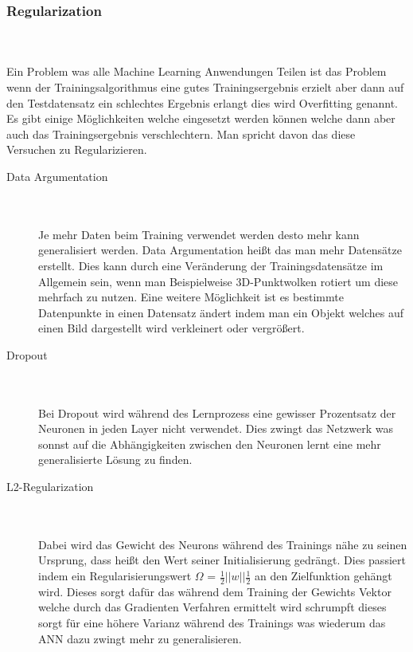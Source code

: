 \documentclass{llncs}
\begin{document}
\subsubsection{Regularization}
~\\\\
Ein Problem was alle Machine Learning Anwendungen Teilen ist das Problem wenn der Trainingsalgorithmus eine gutes Trainingsergebnis erzielt aber dann auf den Testdatensatz ein schlechtes Ergebnis erlangt dies wird Overfitting genannt. Es gibt einige Möglichkeiten welche eingesetzt werden können welche dann aber auch das Trainingsergebnis verschlechtern. Man spricht davon das diese Versuchen zu Regularizieren.

\begin{description}
\item[Data Argumentation]
~\\\\
Je mehr Daten beim Training verwendet werden desto mehr kann generalisiert werden. Data Argumentation heißt das man mehr Datensätze erstellt. Dies kann durch eine Veränderung der Trainingsdatensätze im Allgemein sein, wenn man Beispielweise 3D-Punktwolken rotiert um diese mehrfach zu nutzen. Eine weitere Möglichkeit ist es bestimmte Datenpunkte in einen Datensatz ändert indem man ein Objekt welches auf einen Bild dargestellt wird verkleinert oder vergrößert\cite{Grundlagen}. \\
\item[Dropout]
~\\\\
Bei Dropout wird während des Lernprozess eine gewisser Prozentsatz der Neuronen in jeden Layer nicht verwendet. Dies zwingt das Netzwerk was sonnst auf die Abhängigkeiten zwischen den Neuronen lernt eine mehr generalisierte Lösung zu finden\cite{dropout}.\\
\item[L2-Regularization]
~\\\\
Dabei wird das Gewicht des Neurons während des Trainings nähe zu seinen Ursprung, dass heißt den Wert seiner Initialisierung gedrängt. Dies passiert indem ein Regularisierungswert $\Omega$ = $\frac{1}{2}||w||\frac{1}{2}$ an den Zielfunktion gehängt wird. Dieses sorgt dafür das während dem Training der Gewichts Vektor welche durch das Gradienten Verfahren ermittelt wird schrumpft dieses sorgt für eine höhere Varianz während des Trainings was wiederum das ANN dazu zwingt mehr zu generalisieren\cite{Grundlagen}.\\ 
\end{description}
\end{document}

